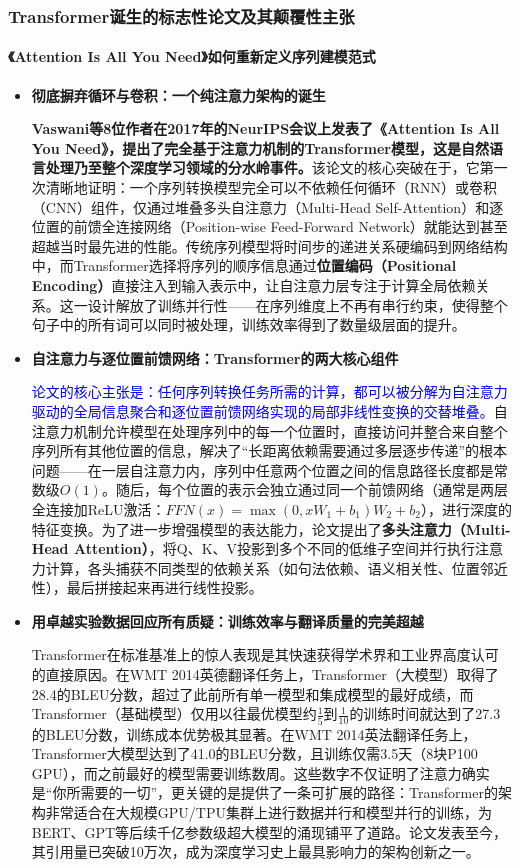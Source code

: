 \documentclass[11pt]{beamer}
\begin{document}
\begin{frame}
\frametitle{Transformer诞生的标志性论文及其颠覆性主张}
\framesubtitle{《Attention Is All You Need》如何重新定义序列建模范式}

\begin{itemize}
    \item \textbf{彻底摒弃循环与卷积：一个纯注意力架构的诞生}
    
    \textbf{Vaswani等8位作者在2017年的NeurIPS会议上发表了《Attention Is All You Need》，提出了完全基于注意力机制的Transformer模型，这是自然语言处理乃至整个深度学习领域的分水岭事件。}该论文的核心突破在于，它第一次清晰地证明：一个序列转换模型完全可以不依赖任何循环（RNN）或卷积（CNN）组件，仅通过堆叠多头自注意力（Multi-Head Self-Attention）和逐位置的前馈全连接网络（Position-wise Feed-Forward Network）就能达到甚至超越当时最先进的性能。传统序列模型将时间步的递进关系硬编码到网络结构中，而Transformer选择将序列的顺序信息通过\textbf{位置编码（Positional Encoding）}直接注入到输入表示中，让自注意力层专注于计算全局依赖关系。这一设计解放了训练并行性——在序列维度上不再有串行约束，使得整个句子中的所有词可以同时被处理，训练效率得到了数量级层面的提升。

    \item \textbf{自注意力与逐位置前馈网络：Transformer的两大核心组件}
    
    \textcolor{blue}{论文的核心主张是：任何序列转换任务所需的计算，都可以被分解为自注意力驱动的全局信息聚合和逐位置前馈网络实现的局部非线性变换的交替堆叠。}自注意力机制允许模型在处理序列中的每一个位置时，直接访问并整合来自整个序列所有其他位置的信息，解决了“长距离依赖需要通过多层逐步传递”的根本问题——在一层自注意力内，序列中任意两个位置之间的信息路径长度都是常数级$O(1)$。随后，每个位置的表示会独立通过同一个前馈网络（通常是两层全连接加ReLU激活：$FFN(x) = \max(0, xW_1 + b_1)W_2 + b_2$），进行深度的特征变换。为了进一步增强模型的表达能力，论文提出了\textbf{多头注意力（Multi-Head Attention）}，将Q、K、V投影到多个不同的低维子空间并行执行注意力计算，各头捕获不同类型的依赖关系（如句法依赖、语义相关性、位置邻近性），最后拼接起来再进行线性投影。

    \item \textbf{用卓越实验数据回应所有质疑：训练效率与翻译质量的完美超越}
    
    \alert{Transformer在标准基准上的惊人表现是其快速获得学术界和工业界高度认可的直接原因。}在WMT 2014英德翻译任务上，Transformer（大模型）取得了28.4的BLEU分数，超过了此前所有单一模型和集成模型的最好成绩，而Transformer（基础模型）仅用以往最优模型约$\frac{1}{5}$到$\frac{1}{10}$的训练时间就达到了27.3的BLEU分数，训练成本优势极其显著。在WMT 2014英法翻译任务上，Transformer大模型达到了41.0的BLEU分数，且训练仅需3.5天（8块P100 GPU），而之前最好的模型需要训练数周。这些数字不仅证明了注意力确实是“你所需要的一切”，更关键的是提供了一条可扩展的路径：Transformer的架构非常适合在大规模GPU/TPU集群上进行数据并行和模型并行的训练，为BERT、GPT等后续千亿参数级超大模型的涌现铺平了道路。论文发表至今，其引用量已突破10万次，成为深度学习史上最具影响力的架构创新之一。
\end{itemize}
\end{frame}
\end{document}
